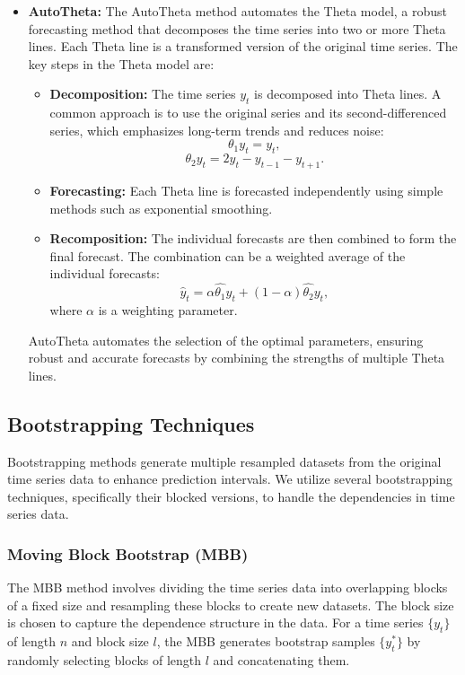 \documentclass{article}
\begin{document}
\begin{itemize}
    \item \textbf{AutoTheta:} The AutoTheta method automates the Theta model, a robust forecasting method that decomposes the time series into two or more Theta lines. Each Theta line is a transformed version of the original time series. The key steps in the Theta model are:
    \begin{itemize}
        \item \textbf{Decomposition:} The time series \(y_t\) is decomposed into Theta lines. A common approach is to use the original series and its second-differenced series, which emphasizes long-term trends and reduces noise:
        \begin{equation}
            \theta_1 y_t = y_t,
        \end{equation}
        \begin{equation}
            \theta_2 y_t = 2 y_t - y_{t-1} - y_{t+1}.
        \end{equation}
        \item \textbf{Forecasting:} Each Theta line is forecasted independently using simple methods such as exponential smoothing.
        \item \textbf{Recomposition:} The individual forecasts are then combined to form the final forecast. The combination can be a weighted average of the individual forecasts:
        \begin{equation}
            \hat{y}_t = \alpha \hat{\theta_1} y_t + (1 - \alpha) \hat{\theta_2} y_t,
        \end{equation}
        where \(\alpha\) is a weighting parameter.
    \end{itemize}
    AutoTheta automates the selection of the optimal parameters, ensuring robust and accurate forecasts by combining the strengths of multiple Theta lines.
    
\end{itemize}


\subsection{Bootstrapping Techniques}
Bootstrapping methods generate multiple resampled datasets from the original time series data to enhance prediction intervals. We utilize several bootstrapping techniques, specifically their blocked versions, to handle the dependencies in time series data.

\subsubsection{Moving Block Bootstrap (MBB)}
The MBB method involves dividing the time series data into overlapping blocks of a fixed size and resampling these blocks to create new datasets. The block size is chosen to capture the dependence structure in the data. For a time series \( \{ y_t \} \) of length \( n \) and block size \( l \), the MBB generates bootstrap samples \( \{ y_t^* \} \) by randomly selecting blocks of length \( l \) and concatenating them.
\end{document}
